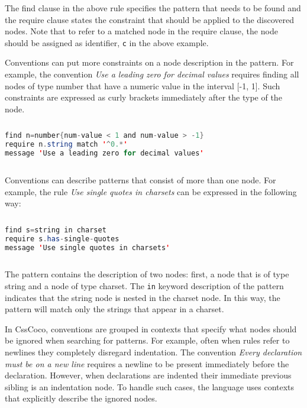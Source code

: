 The find clause in the above rule specifies the pattern that needs to be found and the require
clause states the constraint that should be applied to the discovered nodes. Note that to refer to a
matched node in the require clause, the node should be assigned as identifier, \texttt{c} in the
above example.

Conventions can put more constraints on a node description in the pattern. For example, the
convention \textit{Use a leading zero for decimal values} requires finding all nodes of type number
that have a numeric value in the interval [-1, 1]. Such constraints are expressed as curly brackets
immediately after the type of the node.

\begin{sourcecode}
\begin{lstlisting}[style=mono,language=Java]
find n=number{num-value < 1 and num-value > -1}
require n.string match '^0.*'
message 'Use a leading zero for decimal values'
\end{lstlisting}
\end{sourcecode}

Conventions can describe patterns that consist of more than one node. For example, the rule
\textit{Use single quotes in charsets} can be expressed in the following way:

\begin{sourcecode}
\begin{lstlisting}[style=mono,language=Java]
find s=string in charset
require s.has-single-quotes
message 'Use single quotes in charsets'
\end{lstlisting}
\end{sourcecode}

The pattern contains the description of two nodes: first, a node that is of type string and a node
of type charset. The \texttt{in} keyword description of the pattern indicates that the string node
is nested in the charset node. In this way, the pattern will match only the strings that appear in a
charset.

In CssCoco, conventions are grouped in contexts that specify what nodes should be ignored when
searching for patterns. For example, often when rules refer to newlines they completely disregard
indentation. The convention \textit{Every declaration must be on a new line} requires a newline to
be present immediately before the declaration. However, when declarations are indented their
immediate previous sibling is an indentation node. To handle such cases, the language uses contexts
that explicitly describe the ignored nodes.


